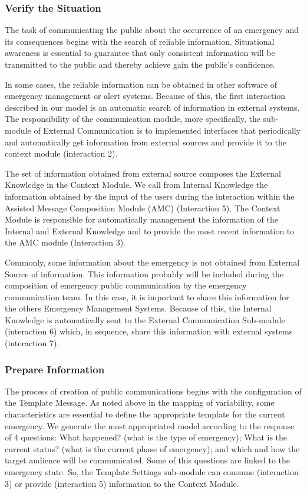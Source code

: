 \subsubsection{Verify the Situation}

The task of communicating the public about the occurrence of an emergency and its consequences begins with the search of reliable information. Situational awareness is essential to guarantee that only consistent information will be transmitted to the public and thereby achieve gain the public's confidence. 

In some cases, the reliable information can be obtained in other software of emergency management or alert systems. Because of this, the first interaction described in our model is an automatic search of information in external systems. The responsibility of the communication module, more specifically, the sub-module of External Communication is to implemented interfaces that periodically and automatically get information from external sources and provide it to the context module (interaction 2). 

The set of information obtained from external source composes the External Knowledge in the Context Module. We call from Internal Knowledge the information obtained by the input of the users during the interaction within the Assisted Message Composition Module (AMC) (Interaction 5). The Context Module is responsible for automatically management the information of the Internal and External Knowledge and to provide the most recent information to the AMC module (Interaction 3).

Commonly, some information about the emergency is not obtained from External Source of information. This information probably will be included during the composition of emergency public communication by the emergency communication team. In this case, it is important to share this information for the others Emergency Management Systems. Because of this, the Internal Knowledge is automatically sent to the External Communication Sub-module (interaction 6) which, in sequence, share this information with external systems (interaction 7).


\subsubsection{Prepare Information}

The process of creation of public communications begins with the configuration of the Template Message. As noted above in the mapping of variability, some characteristics are essential to define the appropriate template for the current emergency. We generate the most appropriated model according to the response of 4 questions: What happened? (what is the type of emergency); What is the current status? (what is the current phase of emergency); and which and how the target audience will be communicated. Some of this questions are linked to the emergency state. So, the Template Settings sub-module can consume (interaction 3) or provide (interaction 5) information to the Context Module. 

